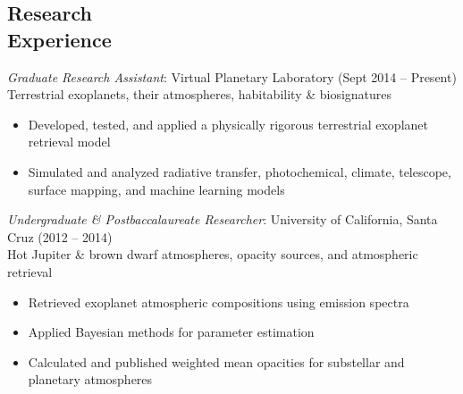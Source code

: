 \documentclass[margin,10pt]{res}
\begin{document}
\begin{resume}
\section{Research \\Experience} 
                {\sl Graduate Research Assistant}: Virtual Planetary Laboratory   \hfill (Sept 2014 -- Present)\\
                Terrestrial exoplanets, their atmospheres, habitability \& biosignatures
                    \begin{itemize}  \itemsep -1pt %
                        \item Developed, tested, and applied a physically rigorous terrestrial exoplanet retrieval model  
                        \item Simulated and analyzed radiative transfer, photochemical, climate, telescope, surface mapping, and machine learning models
                    \end{itemize} 

                {\sl Undergraduate \& Postbaccalaureate Researcher}: University of California, Santa Cruz \hfill          (2012 -- 2014)\\
                Hot Jupiter \& brown dwarf atmospheres, opacity sources, and atmospheric retrieval 
                    \begin{itemize}  \itemsep -1pt %
                        \item Retrieved exoplanet atmospheric compositions using emission spectra 
                        \item Applied Bayesian methods for parameter estimation 
                        \item Calculated and published weighted mean opacities for substellar and planetary atmospheres\\
                    \end{itemize} 
   

\end{resume}
\end{document}
